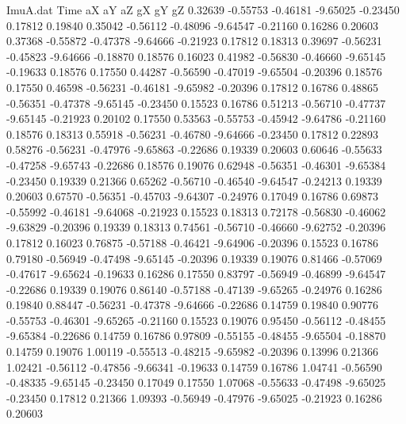 \begin{filecontents}{ImuA.dat}
Time aX aY aZ gX gY gZ
   0.32639   -0.55753   -0.46181   -9.65025   -0.23450    0.17812    0.19840
   0.35042   -0.56112   -0.48096   -9.64547   -0.21160    0.16286    0.20603
   0.37368   -0.55872   -0.47378   -9.64666   -0.21923    0.17812    0.18313
   0.39697   -0.56231   -0.45823   -9.64666   -0.18870    0.18576    0.16023
   0.41982   -0.56830   -0.46660   -9.65145   -0.19633    0.18576    0.17550
   0.44287   -0.56590   -0.47019   -9.65504   -0.20396    0.18576    0.17550
   0.46598   -0.56231   -0.46181   -9.65982   -0.20396    0.17812    0.16786
   0.48865   -0.56351   -0.47378   -9.65145   -0.23450    0.15523    0.16786
   0.51213   -0.56710   -0.47737   -9.65145   -0.21923    0.20102    0.17550
   0.53563   -0.55753   -0.45942   -9.64786   -0.21160    0.18576    0.18313
   0.55918   -0.56231   -0.46780   -9.64666   -0.23450    0.17812    0.22893
   0.58276   -0.56231   -0.47976   -9.65863   -0.22686    0.19339    0.20603
   0.60646   -0.55633   -0.47258   -9.65743   -0.22686    0.18576    0.19076
   0.62948   -0.56351   -0.46301   -9.65384   -0.23450    0.19339    0.21366
   0.65262   -0.56710   -0.46540   -9.64547   -0.24213    0.19339    0.20603
   0.67570   -0.56351   -0.45703   -9.64307   -0.24976    0.17049    0.16786
   0.69873   -0.55992   -0.46181   -9.64068   -0.21923    0.15523    0.18313
   0.72178   -0.56830   -0.46062   -9.63829   -0.20396    0.19339    0.18313
   0.74561   -0.56710   -0.46660   -9.62752   -0.20396    0.17812    0.16023
   0.76875   -0.57188   -0.46421   -9.64906   -0.20396    0.15523    0.16786
   0.79180   -0.56949   -0.47498   -9.65145   -0.20396    0.19339    0.19076
   0.81466   -0.57069   -0.47617   -9.65624   -0.19633    0.16286    0.17550
   0.83797   -0.56949   -0.46899   -9.64547   -0.22686    0.19339    0.19076
   0.86140   -0.57188   -0.47139   -9.65265   -0.24976    0.16286    0.19840
   0.88447   -0.56231   -0.47378   -9.64666   -0.22686    0.14759    0.19840
   0.90776   -0.55753   -0.46301   -9.65265   -0.21160    0.15523    0.19076
   0.95450   -0.56112   -0.48455   -9.65384   -0.22686    0.14759    0.16786
   0.97809   -0.55155   -0.48455   -9.65504   -0.18870    0.14759    0.19076
   1.00119   -0.55513   -0.48215   -9.65982   -0.20396    0.13996    0.21366
   1.02421   -0.56112   -0.47856   -9.66341   -0.19633    0.14759    0.16786
   1.04741   -0.56590   -0.48335   -9.65145   -0.23450    0.17049    0.17550
   1.07068   -0.55633   -0.47498   -9.65025   -0.23450    0.17812    0.21366
   1.09393   -0.56949   -0.47976   -9.65025   -0.21923    0.16286    0.20603

\end{filecontents}
